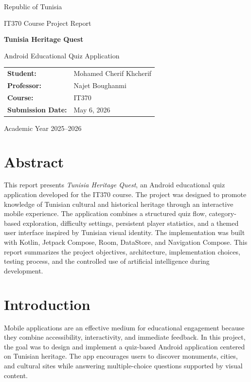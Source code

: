 \documentclass[12pt,a4paper]{article}
\begin{document}
\hypersetup{pageanchor=false}
\begin{titlepage}
\centering
{\Large Republic of Tunisia\par}
\vspace{0.5cm}
{\Large IT370 Course Project Report\par}
\vspace{2cm}
{\Huge \textbf{Tunisia Heritage Quest}\par}
\vspace{0.75cm}
{\Large Android Educational Quiz Application\par}
\vspace{2cm}
\begin{tabular}{ll}
\textbf{Student:} & Mohamed Cherif Khcherif \\
\textbf{Professor:} & Najet Boughanmi \\
\textbf{Course:} & IT370 \\
\textbf{Submission Date:} & May 6, 2026 \\
\end{tabular}
\vfill
{\large Academic Year 2025--2026\par}
\end{titlepage}

\hypersetup{pageanchor=true}
\thispagestyle{empty}
\tableofcontents
\clearpage
{}

\section*{Abstract}
This report presents \textit{Tunisia Heritage Quest}, an Android educational quiz application developed for the IT370 course. The project was designed to promote knowledge of Tunisian cultural and historical heritage through an interactive mobile experience. The application combines a structured quiz flow, category-based exploration, difficulty settings, persistent player statistics, and a themed user interface inspired by Tunisian visual identity. The implementation was built with Kotlin, Jetpack Compose, Room, DataStore, and Navigation Compose. This report summarizes the project objectives, architecture, implementation choices, testing process, and the controlled use of artificial intelligence during development.

\section{Introduction}
Mobile applications are an effective medium for educational engagement because they combine accessibility, interactivity, and immediate feedback. In this project, the goal was to design and implement a quiz-based Android application centered on Tunisian heritage. The app encourages users to discover monuments, cities, and cultural sites while answering multiple-choice questions supported by visual content.
\end{document}
